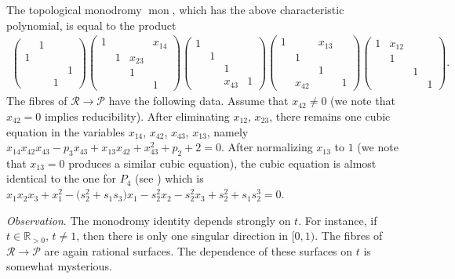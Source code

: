 \documentclass[pdftex]{sigma}
\numberwithin{equation}{section}
\begin{document}
 The topological monodromy $\operatorname{mon}$, which has the above characteristic polynomial, is equal to the
product
\begin{gather*}
\begin{pmatrix} &1 & & \\ 1& & & \\ & & &1 \\ & & 1& \end{pmatrix}
\begin{pmatrix} 1& & &x_{14} \\ & 1&x_{23} & \\ & &1 & \\ & & &1 \end{pmatrix}
\begin{pmatrix} 1& & & \\ & 1& & \\ & & 1& \\ & &x_{43} &1 \end{pmatrix}
 \begin{pmatrix} 1& & x_{13}& \\ & 1& & \\ & & 1& \\ & x_{42}& & 1 \end{pmatrix}
\begin{pmatrix} 1&x_{12} & & \\ & 1& & \\ & & 1& \\ & & & 1 \end{pmatrix}.
\end{gather*}
 The fibres of $\mathcal{R}\rightarrow \mathcal{P}$ have the following data.
Assume that $x_{42}\neq 0$ (we note that $x_{42}=0$ implies reducibility). After eliminating $x_{12}$, $x_{23}$, there remains one
cubic equation in the variables $x_{14}$, $x_{42}$, $x_{43}$, $x_{13}$, namely
$x_{14}x_{42}x_{43} - p_3x_{43} + x_{13}x_{42} + x_{43}^2 + p_2 + 2=0$.
After normalizing $x_{13}$ to $1$ (we note that $x_{13}=0$ produces a similar cubic equation), the cubic equation is almost identical
to the one for $P_4$ (see \cite{vdP-Sa}) which is
$x_1x_2x_3+x_1^2-\big(s_2^2 +s_1s_3\big)x_1-s_2^2x_2-s_2^2x_3+s_2^2+s_1s_2^3=0$.

{\it Observation}. The monodromy identity depends strongly on $t$. For instance, if $t\in \mathbb{R}_{>0}$, $t\neq 1$, then there is only one singular direction in $[0,1)$. The fibres of $\mathcal{R}\rightarrow \mathcal{P}$ are again rational surfaces.
 The dependence of these surfaces on $t$ is somewhat mysterious.
\end{document}

